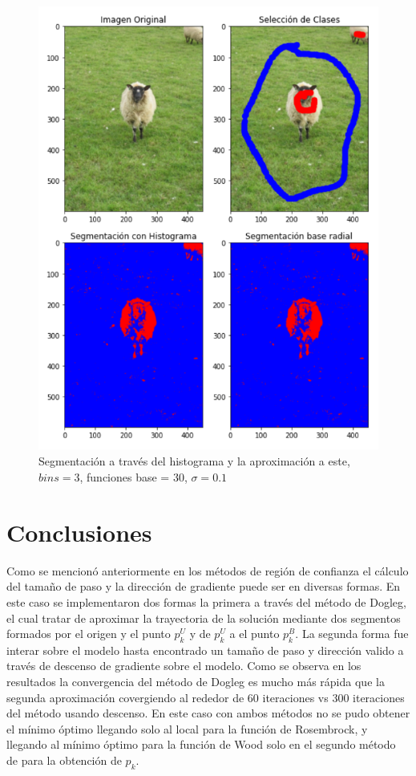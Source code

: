 \documentclass[conference]{IEEEtran}
\begin{document}
\begin{figure}[htbp]
    \centerline{\includegraphics[scale=0.4]{4.png}}
    \caption{Segmentación a través del histograma y la aproximación a este, $bins=3$, funciones base = 30, $\sigma=0.1$}
    \label{img-e3-4}
\end{figure}


\section{Conclusiones}

Como se mencionó anteriormente en los métodos de región de confianza el cálculo del tamaño de paso y
la dirección de gradiente puede ser en diversas formas. En este caso se implementaron dos formas la
primera a través del método de Dogleg, el cual tratar de aproximar la trayectoria de la solución
mediante dos segmentos formados por el origen y el punto $p_k^U$ y de $p_k^U$ a el punto $p_k^B$.
La segunda forma fue interar sobre el modelo hasta encontrado un tamaño de paso y dirección valido
a través de descenso de gradiente sobre el modelo. Como se observa en los resultados la convergencia
del método de Dogleg es mucho más rápida que la segunda aproximación covergiendo al rededor de 60
iteraciones vs 300 iteraciones del método usando descenso. En este caso con ambos métodos no se pudo
obtener el mínimo óptimo llegando solo al local para la función de Rosembrock, y llegando al mínimo
óptimo para la función de Wood solo en el segundo método de para la obtención de $p_k$.\\
\end{document}
